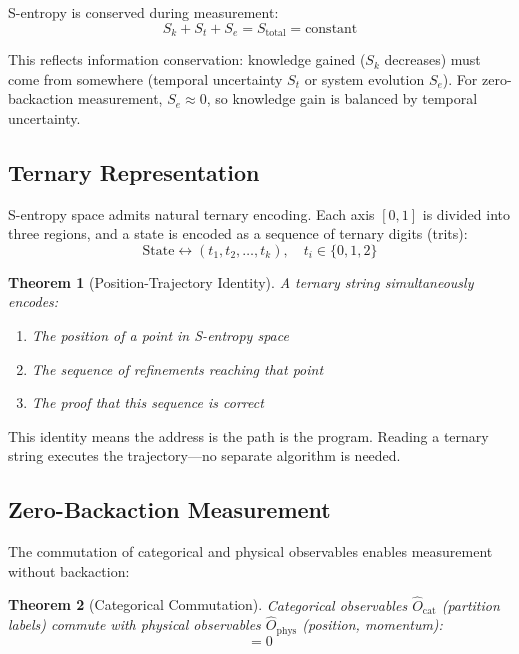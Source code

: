 \documentclass[twocolumn,aps,prx,superscriptaddress,longbibliography]{revtex4-2}
\newtheorem{theorem}{Theorem}[section]
\theoremstyle{remark}
\newcommand{\Sk}{S_k}
\newcommand{\St}{S_t}
\newcommand{\Se}{S_e}
\begin{document}
S-entropy is conserved during measurement:
\begin{equation}
\Sk + \St + \Se = S_\text{total} = \text{constant}
\label{eq:conservation}
\end{equation}

This reflects information conservation: knowledge gained ($\Sk$ decreases)
must come from somewhere (temporal uncertainty $\St$ or system evolution
$\Se$). For zero-backaction measurement, $\Se \approx 0$, so knowledge
gain is balanced by temporal uncertainty.

\subsection{Ternary Representation}

S-entropy space admits natural ternary encoding. Each axis $[0,1]$ is
divided into three regions, and a state is encoded as a sequence of
ternary digits (trits):
\begin{equation}
\text{State} \leftrightarrow (t_1, t_2, \ldots, t_k), \quad t_i \in \{0, 1, 2\}
\label{eq:ternary}
\end{equation}

\begin{theorem}[Position-Trajectory Identity]
\label{thm:identity}
A ternary string simultaneously encodes:
\begin{enumerate}
    \item The position of a point in S-entropy space
    \item The sequence of refinements reaching that point
    \item The proof that this sequence is correct
\end{enumerate}
\end{theorem}

This identity means the address is the path is the program. Reading a
ternary string executes the trajectory---no separate algorithm is needed.

\subsection{Zero-Backaction Measurement}

The commutation of categorical and physical observables enables
measurement without backaction:

\begin{theorem}[Categorical Commutation]
\label{thm:commutation}
Categorical observables $\hat{O}_\text{cat}$ (partition labels) commute
with physical observables $\hat{O}_\text{phys}$ (position, momentum):
\begin{equation}
[\hat{O}_\text{cat}, \hat{O}_\text{phys}] = 0
\label{eq:commutation}
\end{equation}
\end{theorem}
\end{document}
